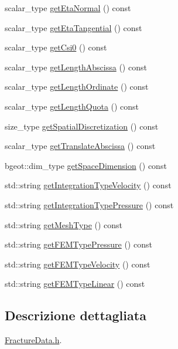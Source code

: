 \begin{DoxyCompactItemize}
\item 
scalar\-\_\-type \hyperlink{classFractureData_a9acc76c77282d4b5d0cdca18c2b1b9ea}{get\-Eta\-Normal} () const 
\item 
scalar\-\_\-type \hyperlink{classFractureData_a7378053b4009825b4a2957484cb2a5e8}{get\-Eta\-Tangential} () const 
\item 
scalar\-\_\-type \hyperlink{classFractureData_a7b75512224a34953960a9bd09f1af661}{get\-Csi0} () const 
\item 
scalar\-\_\-type \hyperlink{classFractureData_abaebcf16d83713858e25837939ad3161}{get\-Length\-Abscissa} () const 
\item 
scalar\-\_\-type \hyperlink{classFractureData_a905e953f685b1329ddcc7ee56f8302b1}{get\-Length\-Ordinate} () const 
\item 
scalar\-\_\-type \hyperlink{classFractureData_a79747fff53da9d858950d83ad0114288}{get\-Length\-Quota} () const 
\item 
size\-\_\-type \hyperlink{classFractureData_a5c10d579be7849be1a126c24982f8a23}{get\-Spatial\-Discretization} () const 
\item 
scalar\-\_\-type \hyperlink{classFractureData_a485e084e083d9181750f19db6842a5e0}{get\-Translate\-Abscissa} () const 
\item 
bgeot\-::dim\-\_\-type \hyperlink{classFractureData_a4ead03266295fe14fa3285692f945d89}{get\-Space\-Dimension} () const 
\item 
std\-::string \hyperlink{classFractureData_a8a8a198482de6bf4104746bc1d0510c6}{get\-Integration\-Type\-Velocity} () const 
\item 
std\-::string \hyperlink{classFractureData_a9333d8e89dc92023d97a48c1905ada76}{get\-Integration\-Type\-Pressure} () const 
\item 
std\-::string \hyperlink{classFractureData_aaded6c0452470489beb4ab95b5f4158f}{get\-Mesh\-Type} () const 
\item 
std\-::string \hyperlink{classFractureData_a643b9a8a33405ec7aaa6b5612cb81d57}{get\-F\-E\-M\-Type\-Pressure} () const 
\item 
std\-::string \hyperlink{classFractureData_a7396b67399a1ae8e5550841907c0dcb5}{get\-F\-E\-M\-Type\-Velocity} () const 
\item 
std\-::string \hyperlink{classFractureData_a606c22e054fdb5f8602ce39fa6ae15cc}{get\-F\-E\-M\-Type\-Linear} () const 
\end{DoxyCompactItemize}


\subsection{Descrizione dettagliata}
\hyperlink{FractureData_8h}{Fracture\-Data.\-h}. 

